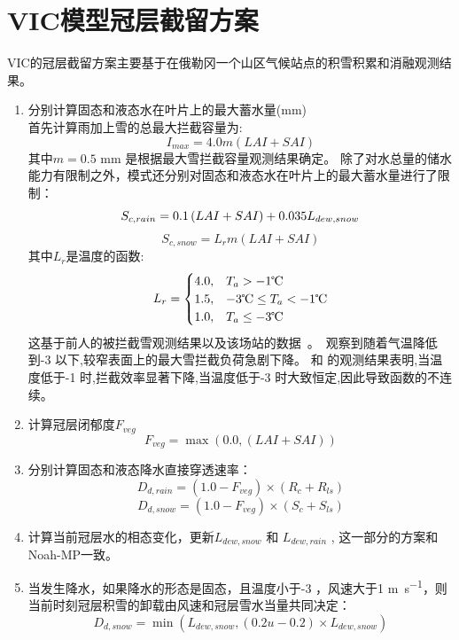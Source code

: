 \section{VIC模型冠层截留方案}
VIC的冠层截留方案\citep{liang1994simple,hamman2018variable}主要基于\citet{storck2002measurement}在俄勒冈一个山区气候站点的积雪积累和消融观测结果。
\begin{enumerate}
\item 分别计算固态和液态水在叶片上的最大蓄水量(mm)\\
首先计算雨加上雪的总最大拦截容量为:
\begin{equation}
I_{max} = 4.0 m (LAI+SAI)
\end{equation}
其中$m=0.5$ mm 是根据最大雪拦截容量观测结果确定。
除了对水总量的储水能力有限制之外，模式还分别对固态和液态水在叶片上的最大蓄水量进行了限制：
\begin{equation}
S_{c,rain}=0.1\left(LAI+SAI\right)+0.035 L_{dew,snow}\\
\end{equation}
\begin{equation}
S_{c,snow}=L_r m (LAI+SAI)
\end{equation}
其中$L_r$是温度的函数:
\begin{equation}
L_r = \begin{cases}
           4.0, & T_a > -1 \text{\textcelsius}\\
            1.5, & -3 \text{\textcelsius} \leq T_a < -1 \text{\textcelsius}\\
           1.0, & T_a \leq -3 \text{\textcelsius}
         \end{cases}
\end{equation}
这基于前人的被拦截雪观测结果以及该场站的数据~\citep{storck2002measurement}。\citet{kobayashi1987snow}~观察到随着气温降低到-3 \textcelsius 以下,较窄表面上的最大雪拦截负荷急剧下降。 \citet{kobayashi1987snow}和 \citet{pfister1999snow}的观测结果表明,当温度低于-1 \textcelsius 时,拦截效率显著下降,当温度低于-3 \textcelsius 时大致恒定,因此导致函数的不连续。
\item 计算冠层闭郁度$F_{veg}$
\begin{equation}
F_{veg} = \max(0.0,\left(LAI+SAI\right))
\end{equation}
\item 分别计算固态和液态降水直接穿透速率：
\begin{equation}
D_{d,rain}=\left(1.0-F_{veg}\right) \times (R_{c}+R_{ls})
\end{equation}
\begin{equation}
D_{d,snow}=\left(1.0-F_{veg}\right) \times (S_{c}+S_{ls})
\end{equation}
\item 计算当前冠层水的相态变化，更新$L_{dew,snow}$ 和 $L_{dew,rain}$ , 这一部分的方案和Noah-MP一致。
\item 当发生降水，如果降水的形态是固态，且温度小于-3 \textcelsius ，风速大于1 \unit{m.s^{-1}}，则当前时刻冠层积雪的卸载由风速和冠层雪水当量共同决定：
\begin{equation}
D_{d,snow} = \min(L_{dew,snow}, \left(0.2u-0.2\right) \times L_{dew,snow})
\end{equation}


\end{enumerate}
